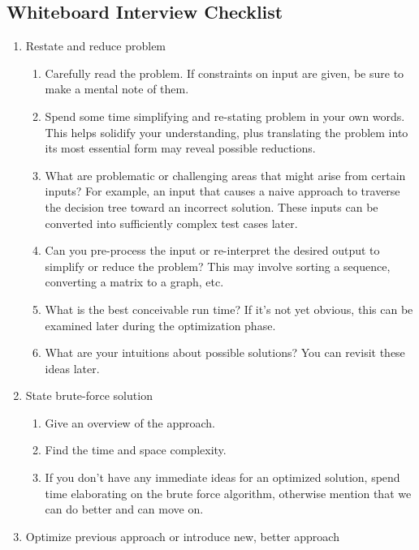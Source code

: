 \documentclass{article}
\begin{document}
\subsection{Whiteboard Interview Checklist}
\begin{enumerate}
    \item  Restate and reduce problem
    \begin{enumerate}
        \item Carefully read the problem. If constraints on input are given, be sure to make a mental note of them.
        \item Spend some time simplifying and re-stating problem in your own words. This helps solidify your understanding, plus translating the problem into its most essential form may reveal possible reductions.
        \item What are problematic or challenging areas that might arise from certain inputs? For example, an input that causes a naive approach to traverse the decision tree toward an incorrect solution. These inputs can be converted into sufficiently complex test cases later.
        \item Can you pre-process the input or re-interpret the desired output to simplify or reduce the problem? This may involve sorting a sequence, converting a matrix to a graph, etc.
        \item What is the best conceivable run time? If it's not yet obvious, this can be examined later during the optimization phase.
        \item What are your intuitions about possible solutions? You can revisit these ideas later.
    \end{enumerate}
    
    \item State brute-force solution
    \begin{enumerate}
        \item Give an overview of the approach.
        \item Find the time and space complexity.
        \item If you don't have any immediate ideas for an optimized solution, spend time elaborating on the brute force algorithm, otherwise mention that we can do better and can move on.
    \end{enumerate}
    
     \item Optimize previous approach or introduce new, better approach


\end{enumerate}
\end{document}
